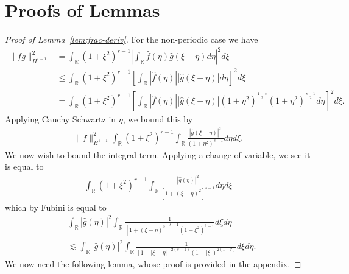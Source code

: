 \documentclass[12pt,reqno]{amsart}
\numberwithin{equation}{section}  %
\numberwithin{figure}{section}
\newcommand{\rr}{\mathbb{R}}
\newcommand{\wh}{\widehat}
\begin{document}
\section{Proofs of Lemmas} 
\label{sec:pf-lemmas}
%
%
%
\begin{proof}[Proof of Lemma~\ref{lem:frac-deriv}]
For the non-periodic case we have
%
%
\begin{equation*}
\begin{split}
  \| fg\|_{H^{r-1}}^{2}
  & = \int_{\rr} (1 + \xi^{2})^{r-1}| \int_{\rr}
  \wh{f}(\eta) \wh{g}( \xi - \eta) d \eta |^{2} d \xi
  \\
  & \le \int_{\rr} (1 + \xi^{2})^{r-1}\left [ \int_{\rr}
  | \wh{f}(\eta) |  | \wh{g}(\xi - \eta) | 
  d \eta \right ]^{2} d \xi
  \\
  & = \int_{\rr}  (1 + \xi^{2})^{r-1}\left [ \int_{\rr}
  | \wh{f}(\eta) |  | \wh{g}(\xi - \eta) | (1 +
  \eta^{2})^{\frac{1-s}{2}} (1 + \eta^{2})^{\frac{s-1}{2}}
  d \eta \right ]^{2} d \xi.
  \end{split}
\end{equation*}
%
Applying Cauchy Schwartz in $\eta$, we bound this by
%
%
%
\begin{equation}
  \label{np-key-term}
\begin{split}
  \| f \|_{H^{s-1}}^{2} \int_{\rr}  (1 + \xi^{2})^{r-1}\int_{\rr} \frac{|
  \wh{g}(\xi - \eta) |^{2}}{(1 + \eta^{2})^{s-1}} d \eta d \xi.
  \end{split}
\end{equation}
%
We now wish to bound the integral term. Applying a change of variable, we see it
is equal to
%
\begin{equation*}
\begin{split}
  \int_{\rr} (1 + \xi^{2})^{r-1} \int_{\rr}
\frac{| \wh{g}(\eta) |^{2}}{[1 + (\xi - \eta)^{2}]^{s-1}} d \eta d \xi
  \end{split}
\end{equation*}
which by Fubini is equal to
%
%
\begin{equation}
  \label{int-pre-calc-lem}
\begin{split}
  & \int_{\rr} | \wh{g}(\eta) |^{2} \int_{\rr} \frac{1}{\left[
  1 + (\xi - \eta)^{2} \right]^{s-1} (1 + \xi^{2})^{1-r}} d \xi d \eta
  \\
  & \lesssim \int_{\rr} | \wh{g}(\eta) |^{2} \int_{\rr} \frac{1}{\left[
  1 + |\xi - \eta| \right]^{2(s-1)} (1 + |\xi|)^{2(1-r)}} d \xi d \eta.
\end{split}
\end{equation}
%
%
We now need the following lemma, whose proof is provided in the appendix.

\end{proof}
\end{document}
